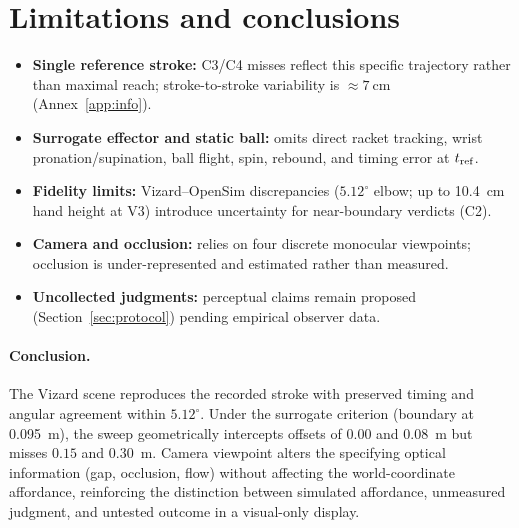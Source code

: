 \section{Limitations and conclusions}\label{sec:limits}

\begin{itemize}
    \item \textbf{Single reference stroke:} C3/C4 misses reflect this specific trajectory rather than maximal reach; stroke-to-stroke variability is $\approx\SI{7}{\centi\meter}$ (Annex~\ref{app:info}).
    \item \textbf{Surrogate effector and static ball:} omits direct racket tracking, wrist pronation/supination, ball flight, spin, rebound, and timing error at $t_{\mathrm{ref}}$.
    \item \textbf{Fidelity limits:} Vizard--OpenSim discrepancies ($5.12^\circ$ elbow; up to \SI{10.4}{\centi\meter} hand height at V3) introduce uncertainty for near-boundary verdicts (C2).
    \item \textbf{Camera and occlusion:} relies on four discrete monocular viewpoints; occlusion is under-represented and estimated rather than measured.
    \item \textbf{Uncollected judgments:} perceptual claims remain proposed (Section~\ref{sec:protocol}) pending empirical observer data.
\end{itemize}

\paragraph{Conclusion.} The Vizard scene reproduces the recorded stroke with preserved timing and angular agreement within $5.12^\circ$. Under the surrogate criterion (boundary at \SI{0.095}{\meter}), the sweep geometrically intercepts offsets of $0.00$ and \SI{0.08}{\meter} but misses $0.15$ and \SI{0.30}{\meter}. Camera viewpoint alters the specifying optical information (gap, occlusion, flow) without affecting the world-coordinate affordance, reinforcing the distinction between simulated affordance, unmeasured judgment, and untested outcome in a visual-only display.
